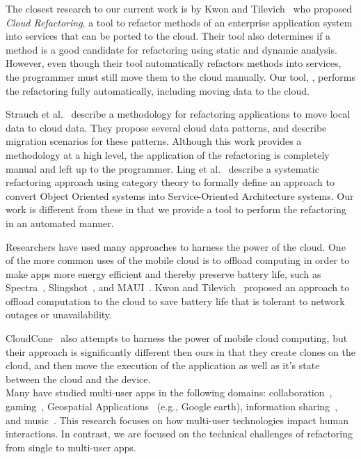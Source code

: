 \documentclass[preprint]{sigplanconf}
\begin{document}
The closest research to our current work is by Kwon and Tilevich~\cite{kwon2013cloud} who proposed \emph{Cloud Refactoring}, a tool to refactor methods of an enterprise application system into services that can be  ported to the cloud. Their tool also determines if a method is a good candidate for refactoring using static and dynamic analysis. However, even though their tool automatically refactors methods into services, the programmer must still move them to the cloud manually.  
Our tool, \tool, performs the refactoring fully automatically, including moving data to the cloud.  


Strauch et al.~\cite{strauchmigrating} describe a methodology for refactoring applications to move local data to cloud data. They propose several cloud data patterns, and describe migration scenarios for these patterns. Although this work provides a methodology at a high level, the application of the refactoring is completely manual and left up to the programmer. 
Ling et al.~\cite{ling2010refactoring} describe a systematic refactoring approach 
using category theory to formally define an approach to convert Object Oriented systems 
into Service-Oriented Architecture systems. 
Our work is different from these in that we provide a tool to perform the refactoring in an automated manner.

Researchers have used many approaches to harness the power of the cloud.
One of the more common uses of the mobile cloud is to offload computing in order to make apps more energy efficient and thereby preserve battery life, such as Spectra~\cite{flinn2002balancing}, Slingshot~\cite{su2005slingshot}, and MAUI~\cite{cuervo2010maui}.  
Kwon and Tilevich~\cite{kwon2012energy} proposed an approach to offload computation to the cloud to save battery life that is tolerant to network outages or unavailability.

CloudCone~\cite{chun2011clonecloud} also attempts to harness the power of mobile cloud computing, but their approach is significantly different then ours in that they create clones on the cloud, and then move the execution of the application as well as it's state between the cloud and the device.  \\

Many have studied multi-user apps in the following domains: collaboration~\cite{Yuill:multiuserColab, Lopez-Gulliver:imageprocessing}, gaming~\cite{Leichtenstern:multiuserGames}, Geospatial Applications~\cite{Forlines:geospatial} (e.g., Google earth), information sharing~\cite{Nacenta:2012:LMM:2307798.2307816}, and music~\cite{Sorensen:2012:ISM:2399016.2399094}. This research focuses on how multi-user technologies impact human interactions. In contrast, we are focused on the technical challenges of refactoring from single to multi-user apps. \\
\end{document}
